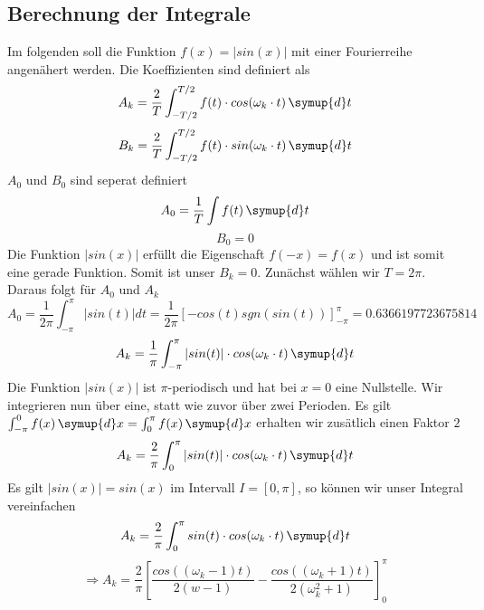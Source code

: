 \subsection{Berechnung der Integrale}
Im folgenden soll die Funktion $f(x)=|sin(x)|$ mit einer Fourierreihe angenähert werden.
Die Koeffizienten sind definiert als
\begin{equation}
A_k=\frac{2}{T} \int_{-T/2}^{T/2} f(t) \cdot cos(\omega_k \cdot t)  \, \symup{d}t
\end{equation}
\begin{equation}
B_k=\frac{2}{T} \int_{-T/2}^{T/2} f(t) \cdot sin(\omega_k \cdot t)  \, \symup{d}t
\end{equation}
$A_0$ und $B_0$ sind seperat definiert
\begin{equation}
  A_0= \frac{1}{T} \int f(t) \, \symup{d}t
\end{equation}
\begin{equation}
  B_0=0
\end{equation}
Die Funktion $|sin(x)|$ erfüllt die Eigenschaft $f(-x) = f(x)$ und ist somit eine gerade Funktion.
Somit ist unser $B_k=0$. 
Zunächst wählen wir $T=2\pi$. Daraus folgt für $A_0$ und $A_k$
\begin{equation}
  A_0=\frac{1}{2\pi} \int_{-\pi}^{\pi} |sin(t)| dt = \frac{1}{2\pi} \left[-cos(t)sgn(sin(t)) \right]_{-\pi}^{\pi} = 0.6366197723675814
\end{equation}
\begin{equation}
A_k=\frac{1}{\pi} \int_{-\pi}^{\pi} |sin(t)| \cdot cos(\omega_k \cdot t) \, \symup{d}t
\end{equation}
Die Funktion $|sin(x)|$ ist $\pi$-periodisch und hat bei $x = 0$ eine Nullstelle.
Wir integrieren nun über eine, statt wie zuvor über zwei Perioden. Es gilt 
$\int_{-\pi}^{0}f(x) \, \symup{d}x = \int_0^{\pi} f(x) \, \symup{d}x$
erhalten wir zusätlich einen Faktor $2$
\begin{equation}
A_k=\frac{2}{\pi} \int_0^{\pi} |sin(t)| \cdot cos(\omega_k \cdot t) \, \symup{d}t
\end{equation}
Es gilt $|sin(x)| = sin(x)$ im Intervall $I=[0,\pi]$, so können wir
unser Integral vereinfachen
\begin{equation}
A_k=\frac{2}{\pi} \int_0^{\pi} sin(t) \cdot cos(\omega_k \cdot t)  \, \symup{d}t
\end{equation}
\begin{equation}
\Rightarrow A_k= \frac{2}{\pi} \left [ \frac{cos((\omega_k-1)t)}{2(w-1)} - \frac{cos((\omega_k+1)t)}{2(\omega_k^2+1)} \right ]_0^{\pi}
\end{equation}
